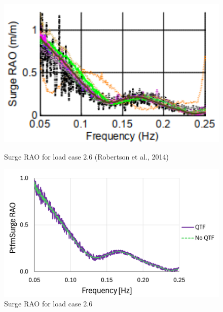 \documentclass[a4paper, 11pt]{article}
\begin{document}
\begin{figure}[H]
    \begin{minipage}{0.48\textwidth}
        \centering
        \includegraphics[width=1\textwidth]{2.6_surge.png}
        \caption{\small Surge RAO for load case 2.6 (Robertson et al., 2014)} 
        \label{fig:2.6_surge}
    \end{minipage}
    \hfill
    \begin{minipage}{0.5\textwidth}
        \centering
        \vspace{-0.2cm}
        \includegraphics[width=1\textwidth]{2.6_surge_mine.png}
        \caption{\small Surge RAO for load case 2.6}
        \label{fig:2.6_surge_mine}
    \end{minipage}
\end{figure}
\end{document}
